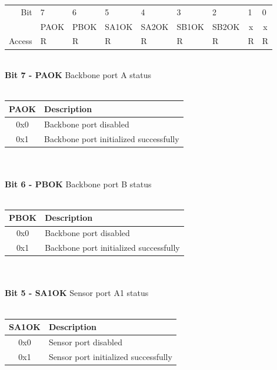 \begin{tabular}{rp{1.25cm}p{1.25cm}p{1.25cm}p{1.25cm}p{1.25cm}p{1.25cm}p{1.25cm}p{1.25cm}}
Bit &
  7 &
  6 &
  5 &
  4 &
  3 &
  2 &
  1 &
  0 \\ \cline{2-9} 

\multicolumn{1}{r|}{} &
  \multicolumn{1}{c|}{\scriptsize{PAOK}} &
  \multicolumn{1}{c|}{\scriptsize{PBOK}} & 
  \multicolumn{1}{c|}{\scriptsize{SA1OK}} &
  \multicolumn{1}{c|}{\scriptsize{SA2OK}} & 
  \multicolumn{1}{c|}{\scriptsize{SB1OK}} & 
  \multicolumn{1}{c|}{\scriptsize{SB2OK}} &
  \multicolumn{1}{c|}{x} &
  \multicolumn{1}{c|}{x} \\\cline{2-9} 
  
Access &
  R &
  R &
  R &
  R &
  R &
  R &
  R &
  R
\end{tabular}
\vspace{0.5cm} \\ 
\textbf{Bit 7 - PAOK} Backbone port A status\\\\
\begin{tabular}{|c|l|}
    \hline
   PAOK & Description\\ \hline
   0x0 & Backbone port disabled\\ \hline
   0x1 & Backbone port initialized successfully \\ \hline
\end{tabular}\\\\
\textbf{Bit 6 - PBOK} Backbone port B status\\\\
\begin{tabular}{|c|l|}
    \hline
   PBOK & Description\\ \hline
   0x0 & Backbone port disabled\\ \hline
   0x1 & Backbone port initialized successfully \\ \hline
\end{tabular}\\\\
\textbf{Bit 5 - SA1OK} Sensor port A1 status\\\\
\begin{tabular}{|c|l|}
    \hline
   SA1OK & Description\\ \hline
   0x0 & Sensor port disabled\\ \hline
   0x1 & Sensor port initialized successfully \\ \hline
\end{tabular}\\\\
